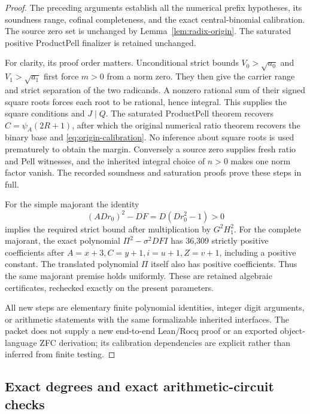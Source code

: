 \begin{proof}
The preceding arguments establish all the numerical prefix hypotheses,
its soundness range, cofinal completeness, and the exact central-binomial
calibration.  The source zero set is unchanged by
Lemma~\ref{lem:radix-origin}.  The saturated positive ProductPell finalizer
is retained unchanged.

For clarity, its proof order matters.  Unconditional strict bounds
$V_0>\sqrt{a_0}$ and $V_1>\sqrt{a_1}$ first force $m>0$ from a norm zero.
They then give the carrier range and strict separation of the two
radicands.  A nonzero rational sum of their signed square roots forces
each root to be rational, hence integral.  This supplies the square
conditions and $J\mid Q$.  The saturated ProductPell theorem recovers
$C=\psi_A(2R+1)$, after which the original numerical ratio theorem
recovers the binary base and \eqref{eq:origin-calibration}.  No inference
about square roots is used prematurely to obtain the margin.
Conversely a source zero supplies fresh ratio and Pell witnesses,
and the inherited integral choice of $n>0$ makes one norm factor vanish.
The recorded soundness and saturation proofs prove these steps in full.

For the simple majorant the identity
\[
 (ADr_0)^2-DF=D(Dr_0^2-1)>0
\]
implies the required strict bound after multiplication by $G^2H_1^2$.
For the complete majorant, the exact polynomial
$\Pi^2-\sigma^2DFI$ has 36,309 strictly positive coefficients after
$A=x+3,C=y+1,i=u+1,Z=v+1$, including a positive constant.
The translated polynomial $\Pi$ itself also has positive coefficients.
Thus the same majorant premise holds uniformly.  These are retained
algebraic certificates, rechecked exactly on the present parameters.

All new steps are elementary finite polynomial identities, integer digit
arguments, or arithmetic statements with the same formalizable inherited
interfaces.  The packet does not supply a new end-to-end Lean/Rocq proof
or an exported object-language ZFC derivation; its calibration dependencies
are explicit rather than inferred from finite testing.
\end{proof}

\subsection{Exact degrees and exact arithmetic-circuit checks}

